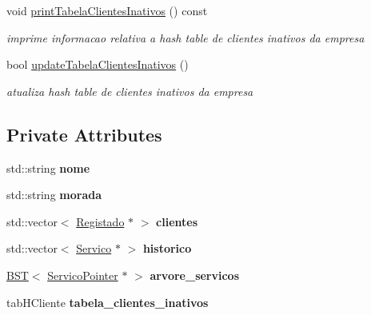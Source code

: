 \begin{DoxyCompactItemize}
void \hyperlink{class_empresa_a232b5da45afd7aad19ab503210b0c922}{print\+Tabela\+Clientes\+Inativos} () const
\begin{DoxyCompactList}\small\item\em imprime informacao relativa a hash table de clientes inativos da empresa \end{DoxyCompactList}\item 
bool \hyperlink{class_empresa_a99f0d3892ad29e4c44e72f14189c4388}{update\+Tabela\+Clientes\+Inativos} ()
\begin{DoxyCompactList}\small\item\em atualiza hash table de clientes inativos da empresa \end{DoxyCompactList}\end{DoxyCompactItemize}
\subsection*{Private Attributes}
\begin{DoxyCompactItemize}
\item 
\mbox{\label{class_empresa_affa32f93b722be794531dbfb26cb19b3}} 
std\+::string {\bfseries nome}
\item 
\mbox{\label{class_empresa_a73cf106d1c427875d58d7adc0ff298e8}} 
std\+::string {\bfseries morada}
\item 
\mbox{\label{class_empresa_aed45bb351ecd8503398d43c7da1487f8}} 
std\+::vector$<$ \hyperlink{class_registado}{Registado} $\ast$ $>$ {\bfseries clientes}
\item 
\mbox{\label{class_empresa_ae8b0f4fece7e5c01d136ab79418f728b}} 
std\+::vector$<$ \hyperlink{class_servico}{Servico} $\ast$ $>$ {\bfseries historico}
\item 
\mbox{\label{class_empresa_ae7a1dd04902ed33525db1c6400cade59}} 
\hyperlink{class_b_s_t}{B\+ST}$<$ \hyperlink{class_servico_pointer}{Servico\+Pointer} $\ast$ $>$ {\bfseries arvore\+\_\+servicos}
\item 
\mbox{\label{class_empresa_a8d9511b3a8b0031f1819a15705b2e4a6}} 
tab\+H\+Cliente {\bfseries tabela\+\_\+clientes\+\_\+inativos}
\end{DoxyCompactItemize}


